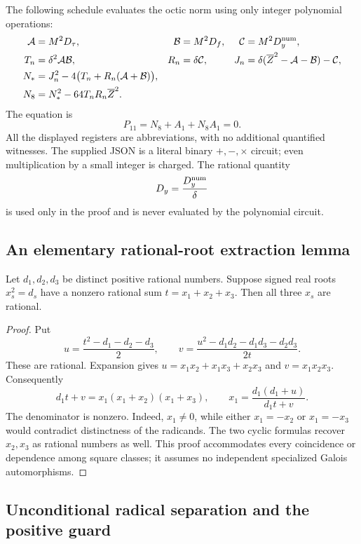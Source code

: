 The following schedule evaluates the octic norm using only integer
polynomial operations:
\begin{align}
 \mathcal A&=M^2D_\tau,&
 \mathcal B&=M^2D_f,&
 \mathcal C&=M^2D_y^{\rm num},\nonumber\\
 T_n&=\delta^2\mathcal A\mathcal B,&
 R_n&=\delta\mathcal C,&
 J_n&=\delta(\overline Z^2-\mathcal A-\mathcal B)-\mathcal C,
       \nonumber\\
 N_*&=J_n^2-4\bigl(T_n+R_n(\mathcal A+\mathcal B)\bigr),
       \nonumber\\
 N_8&=N_*^2-64T_nR_n\overline Z^2.
 \label{rt11:norm}
\end{align}
The equation is
\begin{equation}
 \boxed{\ P_{11}=N_8+A_1+N_8A_1=0.\ }
 \label{rt11:equation}
\end{equation}
All the displayed registers are abbreviations, with no additional
quantified witnesses. The supplied JSON is a literal binary
$+,-,\times$ circuit; even multiplication by a small integer is charged.
The rational quantity
\[
 D_y=\frac{D_y^{\rm num}}\delta
\]
is used only in the proof and is never evaluated by the polynomial circuit.

\subsection{An elementary rational-root extraction lemma}

\begin{lemma}
\label{rt11:rational}
Let $d_1,d_2,d_3$ be distinct positive rational numbers. Suppose signed
real roots $x_s^2=d_s$ have a nonzero rational sum $t=x_1+x_2+x_3$.
Then all three $x_s$ are rational.
\end{lemma}
\begin{proof}
Put
\[
 u=\frac{t^2-d_1-d_2-d_3}{2},\qquad
 v=\frac{u^2-d_1d_2-d_1d_3-d_2d_3}{2t}.
\]
These are rational. Expansion gives
$u=x_1x_2+x_1x_3+x_2x_3$ and $v=x_1x_2x_3$. Consequently
\[
 d_1t+v=x_1(x_1+x_2)(x_1+x_3),\qquad
 x_1=\frac{d_1(d_1+u)}{d_1t+v}.
\]
The denominator is nonzero. Indeed, $x_1\ne0$, while either
$x_1=-x_2$ or $x_1=-x_3$ would contradict distinctness of the radicands.
The two cyclic formulas recover $x_2,x_3$ as rational numbers as well.
This proof accommodates every coincidence or dependence among square
classes; it assumes no independent specialized Galois automorphisms.
\end{proof}

\subsection{Unconditional radical separation and the positive guard}

